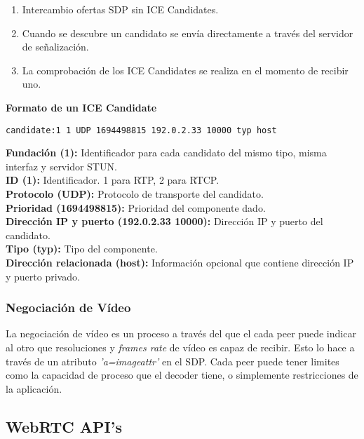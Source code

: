 \begin{enumerate}
\item Intercambio ofertas SDP sin ICE Candidates.
\item Cuando se descubre un candidato se envía directamente a través del servidor de señalización.
\item La comprobación de los ICE Candidates se realiza en el momento de recibir uno.
\end{enumerate}

\begin{normalsize}
\noindent \textbf{Formato de un ICE Candidate}\\
\end{normalsize}

\begin{lstlisting}[caption=Ejemplo paquete SDP]
candidate:1 1 UDP 1694498815 192.0.2.33 10000 typ host
\end{lstlisting}

\noindent \textbf{Fundación (1):} Identificador para cada candidato del mismo tipo, misma interfaz y servidor STUN.\\
\textbf{ID (1):} Identificador. 1 para RTP, 2 para RTCP.\\
\textbf{Protocolo (UDP):} Protocolo de transporte del candidato.\\
\textbf{Prioridad (1694498815): }Prioridad del componente dado.\\
\textbf{Dirección IP y puerto (192.0.2.33 10000): }Dirección IP y puerto del candidato.\\
\textbf{Tipo (typ):} Tipo del componente.\\
\textbf{Dirección relacionada (host):} Información opcional que contiene dirección IP y puerto privado.\\

\subsubsection{Negociación de Vídeo}

La negociación de vídeo es un proceso a través del que el cada peer puede indicar al otro que resoluciones y \textit{frames rate} de vídeo es capaz de recibir. Esto lo hace a través de un atributo \textit{'a=imageattr'} en el SDP. Cada peer puede tener limites como la capacidad de proceso que el decoder tiene, o simplemente restricciones de la aplicación.\\


\subsection{WebRTC API's}

